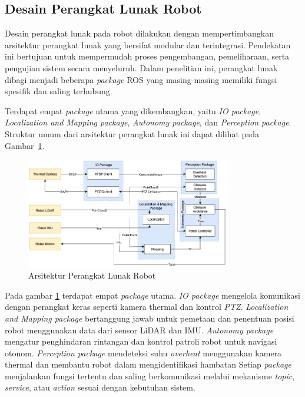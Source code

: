 \subsection{Desain Perangkat Lunak Robot}
Desain perangkat lunak pada robot dilakukan dengan mempertimbangkan arsitektur perangkat lunak yang bersifat modular dan terintegrasi. Pendekatan ini bertujuan untuk mempermudah proses pengembangan, pemeliharaan, serta pengujian sistem secara menyeluruh. Dalam penelitian ini, perangkat lunak dibagi menjadi beberapa \textit{package} ROS yang masing-masing memiliki fungsi spesifik dan saling terhubung.

Terdapat empat \textit{package} utama yang dikembangkan, yaitu \textit{IO package}, \textit{Localization and Mapping package}, \textit{Autonomy package}, dan \textit{Perception package}. Struktur umum dari arsitektur perangkat lunak ini dapat dilihat pada Gambar~\ref{fig:software-arch}.

\begin{figure}[H]
  \centering
  \includegraphics[width=0.8\textwidth]{gambar/bab3/sotware-arch.png}
  \caption{Arsitektur Perangkat Lunak Robot}
  \label{fig:software-arch}
\end{figure}

Pada gambar \ref{fig:software-arch} terdapat empat \emph{package} utama. \emph{IO package} mengelola komunikasi dengan perangkat keras seperti kamera thermal dan kontrol \emph{PTZ}. \emph{Localization and Mapping package} bertanggung jawab untuk pemetaan dan penentuan posisi robot menggunakan data dari sensor LiDAR dan IMU. \emph{Autonomy package} mengatur penghindaran rintangan dan kontrol patroli robot untuk navigasi otonom. \emph{Perception package} mendeteksi suhu \emph{overheat} menggunakan kamera thermal dan membantu robot dalam mengidentifikasi hambatan Setiap \textit{package} menjalankan fungsi tertentu dan saling berkomunikasi melalui mekanisme \textit{topic}, \textit{service}, atau \textit{action} sesuai dengan kebutuhan sistem.

